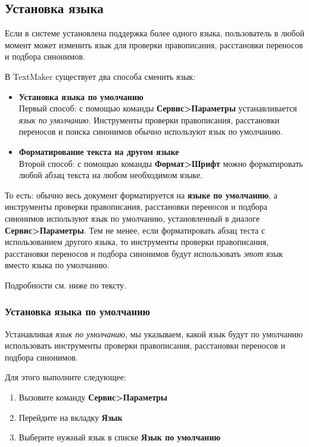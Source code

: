 ﻿\documentclass[a4paper,10pt]{article}
\begin{document}
\subsection{Установка языка} \label{sec:установкаязыка}
Если в системе установлена поддержка более одного языка, пользователь в любой момент может изменить язык для проверки правописания, расстановки переносов и подбора синонимов.

В TextMaker существует два способа сменить язык:
\begin{itemize}
 \item \textbf{Установка языка по умолчанию}\\
  Первый способ: с помощью команды \textbf{Сервис>Параметры} устанавливается \textit{язык по умолчанию}. Инструменты проверки правописания, расстановки переносов и поиска синонимов обычно используют язык по умолчанию.
  \item \textbf{Форматирование текста на другом языке}\\
  Второй способ: с помощью команды \textbf{Формат>Шрифт} можно форматировать любой абзац текста на любом необходимом языке.
\end{itemize}

То есть: обычно весь документ форматируется на \textbf{языке по умолчанию}, а инструменты проверки правописания, расстановки переносов и подбора синонимов используют язык по умолчанию, установленный в диалоге \textbf{Сервис>Параметры}. Тем не менее, если форматировать абзац теста с использованием другого языка, то инструменты проверки правописания, расстановки переносов и подбора синонимов будут использовать \textit{этот} язык вместо языка по умолчанию.

Подробности см. ниже по тексту.

\subsubsection{Установка языка по умолчанию}
Устанавливая \textit{язык по умолчанию}, мы указываем, какой язык будут по умолчанию использовать инструменты проверки правописания, расстановки переносов и подбора синонимов.

Для этого выполните следующее:

\begin{enumerate}
 \item Вызовите команду \textbf{Сервис>Параметры}
 \item Перейдите на вкладку \textbf{Язык}
 \item Выберите нужный язык в списке \textbf{Язык по умолчанию}
\end{enumerate}
\end{document}
